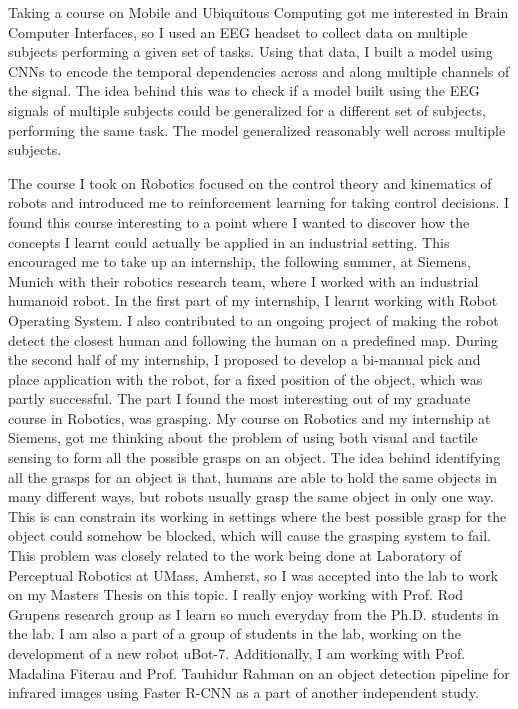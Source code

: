 \documentclass[10pt]{article}
\begin{document}
Taking a course on Mobile and Ubiquitous Computing got me interested in Brain Computer Interfaces, so I used an EEG headset to collect data on multiple subjects performing a given set of tasks. Using that data, I built a model using CNNs to encode the temporal dependencies across and along multiple channels of the signal. The idea behind this was to check if a model built using the EEG signals of multiple subjects could be generalized for a different set of subjects, performing the same task. The model generalized reasonably well across multiple subjects.  
\par
The course I  took on Robotics focused on the control theory and kinematics of robots and introduced me to reinforcement learning for taking control decisions. I found this course interesting to a point where I wanted to discover how the concepts I learnt could actually be applied in an industrial setting. This encouraged me to take up an internship, the following summer, at Siemens, Munich with their robotics research team, where I worked with an industrial humanoid robot. In the first part of my internship, I learnt working with Robot Operating System. I also contributed to an ongoing project of making the robot detect the closest human and following the human on a predefined map. During the second half of my internship, I proposed to develop a bi-manual pick and place application with the robot, for a fixed position of the object, which was partly successful. The part I found the most interesting out of my graduate course in Robotics, was grasping. My course on Robotics and my internship at Siemens, got me thinking about the problem of using both visual and tactile sensing to form all the possible grasps on an object. The idea behind identifying all the grasps for an object is that, humans are able to hold the same objects in many different ways, but robots usually grasp the same object in only one way. This is can constrain its working in settings where the best possible grasp for the object could somehow be blocked, which will cause the grasping system to fail. This problem was closely related to the work being done at Laboratory of Perceptual Robotics at UMass, Amherst, so I was accepted into the lab to work on my Master\textquotesingle s Thesis on this topic. I really enjoy working with Prof. Rod Grupen\textquotesingle s research group as I learn so much everyday from the Ph.D. students in the lab. I am also a part of a group of students in the lab, working on the development of a new robot uBot-7. Additionally, I am working with Prof. Madalina Fiterau and Prof. Tauhidur Rahman on an object detection pipeline for infrared images using Faster R-CNN as a part of another independent study. 
\end{document}
